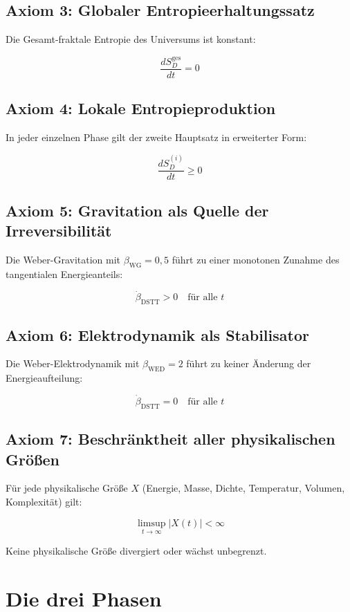 \subsection{Axiom 3: Globaler Entropieerhaltungssatz}

Die Gesamt-fraktale Entropie des Universums ist konstant:

\[
\frac{dS_D^{\text{ges}}}{dt} = 0 \tag{M.3}
\]

\subsection{Axiom 4: Lokale Entropieproduktion}

In jeder einzelnen Phase gilt der zweite Hauptsatz in erweiterter Form:

\[
\frac{dS_D^{(i)}}{dt} \geq 0 \tag{M.4}
\]

\subsection{Axiom 5: Gravitation als Quelle der Irreversibilität}

Die Weber-Gravitation mit $\beta_{\text{WG}} = 0,5$ führt zu einer monotonen Zunahme 
des tangentialen Energieanteils:

\[
\dot{\beta}_{\text{DSTT}} > 0 \quad \text{für alle } t \tag{M.5}
\]

\subsection{Axiom 6: Elektrodynamik als Stabilisator}

Die Weber-Elektrodynamik mit $\beta_{\text{WED}} = 2$ führt zu keiner Änderung der 
Energieaufteilung:

\[
\dot{\beta}_{\text{DSTT}} = 0 \quad \text{für alle } t \tag{M.6}
\]

\subsection{Axiom 7: Beschränktheit aller physikalischen Größen}

Für jede physikalische Größe $X$ (Energie, Masse, Dichte, Temperatur, Volumen, 
Komplexität) gilt:

\[
\limsup_{t \to \infty} |X(t)| < \infty \tag{M.7}
\]

Keine physikalische Größe divergiert oder wächst unbegrenzt.

\section{Die drei Phasen}

